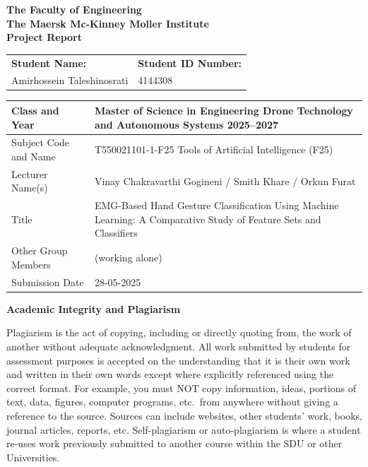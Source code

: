\documentclass[11pt,a4paper]{article}
\begin{document}
\begin{titlepage}
\centering
\vspace*{1.5cm}
{\large\textbf{The Faculty of Engineering}\\[0.3cm]
\textbf{The Maersk Mc-Kinney Moller Institute}\\[0.3cm]
\textbf{Project Report}}

\vspace{1.5cm}

\begin{tabular}{|p{7.5cm}|p{7.5cm}|}
\hline
\textbf{Student Name:} & \textbf{Student ID Number:} \\[0.4cm]
Amirhossein Taleshinosrati & 4144308 \\[0.3cm]
\hline
\end{tabular}

\vspace{0.8cm}

\begin{tabular}{|p{4.2cm}|p{10.8cm}|}
\hline
Class and Year         & Master of Science in Engineering Drone Technology and Autonomous Systems 2025--2027 \\
\hline
Subject Code and Name  & T550021101-1-F25 Tools of Artificial Intelligence (F25) \\
\hline
Lecturer Name(s)       & Vinay Chakravarthi Gogineni / Smith Khare / Orkun Furat \\
\hline
Title                  & EMG-Based Hand Gesture Classification Using Machine Learning: A Comparative Study of Feature Sets and Classifiers \\
\hline
Other Group Members    & (working alone) \\
\hline
Submission Date        & 28-05-2025 \\
\hline
\end{tabular}

\vspace{1.5cm}

\begin{flushleft}
\textbf{Academic Integrity and Plagiarism}

\vspace{0.3cm}
{\small Plagiarism is the act of copying, including or directly quoting from, the work of another without
adequate acknowledgment. All work submitted by students for assessment purposes is accepted on the
understanding that it is their own work and written in their own words except where explicitly referenced
using the correct format. For example, you must NOT copy information, ideas, portions of text, data,
figures, computer programs, etc.\ from anywhere without giving a reference to the source. Sources can
include websites, other students' work, books, journal articles, reports, etc. Self-plagiarism or
auto-plagiarism is where a student re-uses work previously submitted to another course within the SDU
or other Universities.

}
\end{flushleft}
\end{titlepage}
\end{document}
